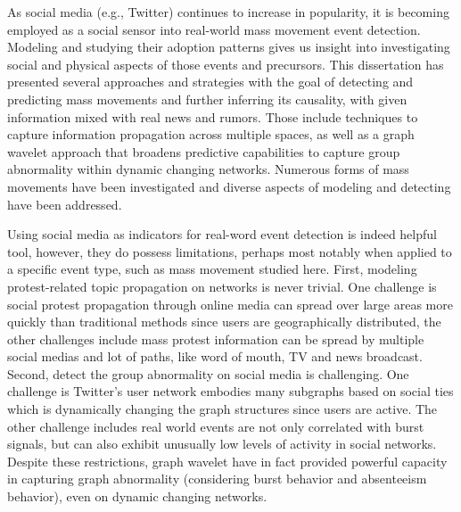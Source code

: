
As social media (e.g., Twitter) continues to increase in popularity, it is becoming employed
as a social sensor into real-world mass movement event detection. Modeling and studying their adoption patterns gives us insight into investigating social and physical aspects of those events and precursors. This dissertation has presented several approaches and strategies with the goal of detecting and predicting mass movements and further inferring its causality, with given information mixed with real news and rumors. Those include techniques to capture information propagation across multiple spaces, as well as a graph wavelet approach that broadens predictive capabilities to capture group abnormality within dynamic changing networks. Numerous forms of mass movements have been investigated and diverse aspects of modeling and detecting have been addressed.

Using social media as indicators for real-word event detection is indeed helpful tool, however, they do possess limitations, perhaps most notably when applied to a specific event type, such as mass movement studied here. First, modeling protest-related topic propagation on networks is never trivial. One challenge is social protest propagation through online media can spread over large areas more quickly than traditional methods since users are geographically distributed, the other challenges include mass protest information can be spread by multiple social medias and lot of paths, like word of mouth, TV and news broadcast. Second, detect the group abnormality on social media is challenging. One challenge is Twitter's user network embodies many subgraphs based on social ties which is dynamically changing the graph structures since users are active. The other challenge includes real world events are not only correlated with burst signals, but can also exhibit unusually low levels of activity in social networks.
Despite these restrictions, graph wavelet have in fact provided powerful capacity in capturing graph abnormality (considering burst behavior and absenteeism behavior), even on dynamic changing networks.


